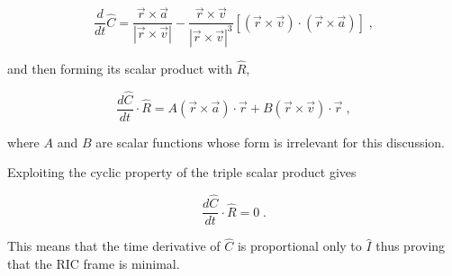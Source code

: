 \documentclass[10pt]{article}
\begin{document}
\[ \frac{d}{dt} \hat C = \frac{ \vec r \times \vec a}{|\vec r \times \vec v|} - \frac{ \vec r \times \vec v}{|\vec r \times \vec v|^3}  \left[ (\vec r \times \vec v) \cdot (\vec r \times \vec a) \right] \; , \]

and then forming its scalar product with $\hat R$,

\[ \frac{d \hat C}{d t} \cdot \hat R = A (\vec r \times \vec a ) \cdot \vec r + B (\vec r \times \vec v) \cdot \vec r \; ,\]

where $A$ and $B$ are scalar functions whose form is irrelevant for this discussion.

Exploiting the cyclic property of the triple scalar product gives

\[ \frac{d \hat C}{d t} \cdot \hat R = 0 \; .\]

This means that the time derivative of $\hat C$ is proportional only to $\hat I$ thus proving that the RIC frame is minimal.
\end{document}
